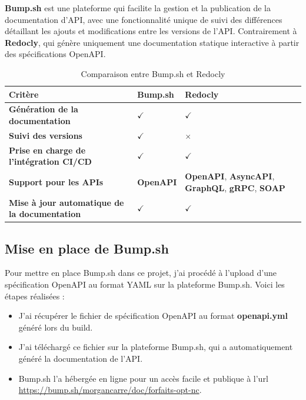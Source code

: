 \documentclass{article}
\begin{document}
	\textbf{Bump.sh} est une plateforme qui facilite la gestion et la publication de la documentation d'API, avec une fonctionnalité unique de suivi des différences détaillant les ajouts et modifications entre les versions de l'API. Contrairement à \textbf{Redocly}, qui génère uniquement une documentation statique interactive à partir des spécifications OpenAPI.	
	
	\begin{table}[h!]
		\centering
		\begin{tabularx}{\textwidth}{|X|X|X|}
			\hline
			\textbf{Critère} & \textbf{Bump.sh} & \textbf{Redocly} \\
			\hline
			\textbf{Génération de la documentation} & $\checkmark$ & $\checkmark$ \\
			\hline
			\textbf{Suivi des versions} & $\checkmark$ & $\times$ \\
			\hline
			\textbf{Prise en charge de l'intégration CI/CD} & $\checkmark$ & $\checkmark$ \\
			\hline
			\textbf{Support pour les APIs} &  \textbf{OpenAPI} & \textbf{OpenAPI}, \textbf{AsyncAPI}, \textbf{GraphQL}, \textbf{gRPC}, \textbf{SOAP}  \\
			\hline
			\textbf{Mise à jour automatique de la documentation} & $\checkmark$ & $\checkmark$ \\
			\hline
		\end{tabularx}
		\caption{Comparaison entre Bump.sh et Redocly}
	\end{table}
	\subsection{Mise en place de Bump.sh}
	
	Pour mettre en place Bump.sh dans ce projet, j'ai procédé à l'upload d'une spécification OpenAPI au format YAML sur la plateforme Bump.sh. Voici les étapes réalisées :
	
	\begin{itemize}
		\item J'ai récupérer le fichier de spécification OpenAPI au format \textbf{openapi.yml} généré lors du build.
		\item J'ai téléchargé ce fichier sur la plateforme Bump.sh, qui a automatiquement généré la documentation de l'API.
		\item Bump.sh l'a hébergée en ligne pour un accès facile et publique à l'url \url{https://bump.sh/morgancarre/doc/forfaits-opt-nc}.
	\end{itemize}
	
\end{document}
